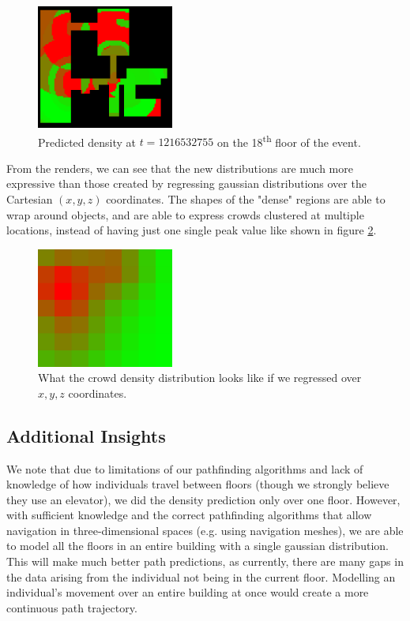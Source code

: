 \documentclass[letterpaper]{article}
\begin{document}
\begin{figure}[h!]
  \centering
    \includegraphics[width=170px]{diagrams/26-27_86-83_59-49_1216532755_predicted.png}
  \caption{Predicted density at $t=1216532755$ on the 18\textsuperscript{th} floor of the event.}
  \label{fig:t4dist}
\end{figure}

From the renders, we can see that the new distributions are much more expressive than those created by regressing gaussian distributions over the Cartesian $(x,y,z)$ coordinates. The shapes of the "dense" regions are able to wrap around objects, and are able to express crowds clustered at multiple locations, instead of having just one single peak value like shown in figure \ref{fig:xyzdist}.

\begin{figure}[h!]
  \centering
    \includegraphics[width=170px]{diagrams/1_1216440525p.png}
  \caption{What the crowd density distribution looks like if we regressed over $x,y,z$ coordinates.}
  \label{fig:xyzdist}
\end{figure}


\subsection{Additional Insights}

We note that due to limitations of our pathfinding algorithms and lack of knowledge of how individuals travel between floors (though we strongly believe they use an elevator), we did the density prediction only over one floor. However, with sufficient knowledge and the correct pathfinding algorithms that allow navigation in three-dimensional spaces (e.g. using navigation meshes), we are able to model all the floors in an entire building with a single gaussian distribution. This will make much better path predictions, as currently, there are many gaps in the data arising from the individual not being in the current floor. Modelling an individual's movement over an entire building at once would create a more continuous path trajectory.\\
\end{document}
